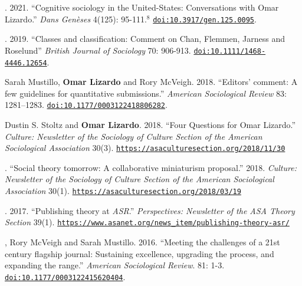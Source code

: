 
. 2021. ``Cognitive sociology in the United-States: Conversations with Omar Lizardo.'' {\em Dans Gen\`{e}ses} 4(125): 95-111.\textcolor{uclablue}{$^{8}$} \href{https://doi.org/10.3917/gen.125.0095}{\nolinkurl{doi:10.3917/gen.125.0095}}.

. 2019. ``Classes and classification: Comment on Chan, Flemmen, Jarness and Roselund'' {\em British Journal of Sociology} 70: 906-913. \href{https://doi.org/10.1111/1468-4446.12654}{\nolinkurl{doi:10.1111/1468-4446.12654}}.

\ind Sarah Mustillo, {\bf Omar Lizardo} and Rory McVeigh. 2018. ``Editors' comment: A few guidelines for quantitative submissions.'' {\em American Sociological Review} 83: 1281–1283. \href{https://doi.org/10.1177/0003122418806282}{\nolinkurl{doi:10.1177/0003122418806282}}.

\ind Dustin S. Stoltz and {\bf Omar Lizardo}. 2018. ``Four Questions for Omar Lizardo.'' \emph{Culture: Newsletter of the Sociology of Culture Section of the American Sociological Association}  30(3). \href{https://asaculturesection.org/2018/11/30/four-questions-for-omar-lizardo/}{\nolinkurl{https://asaculturesection.org/2018/11/30}}

. ``Social theory tomorrow: A collaborative miniaturism proposal.'' 2018. \emph{Culture: Newsletter of the Sociology of Culture Section of the American Sociological Association}  30(1). \href{https://asaculturesection.org/2018/03/19/symposium-on-social-theory-now-social-theory-tomorrow-a-collaborative-miniaturism-proposal/}{\nolinkurl{https://asaculturesection.org/2018/03/19}}

. 2017. ``Publishing theory at {\em ASR}.'' {\em Perspectives: Newsletter of the ASA Theory Section} 39(1). \newline \href{https://www.asanet.org/news_item/publishing-theory-asr/}{\nolinkurl{https://www.asanet.org/news_item/publishing-theory-asr/}}

, Rory McVeigh and Sarah Mustillo. 2016. ``Meeting the challenges of a 21st century flagship journal: Sustaining excellence, upgrading the process, and expanding the range.'' {\em American Sociological Review}. 81: 1-3. \href{https://doi.org/10.1177/0003122415620404}{\nolinkurl{doi:10.1177/0003122415620404}}.
